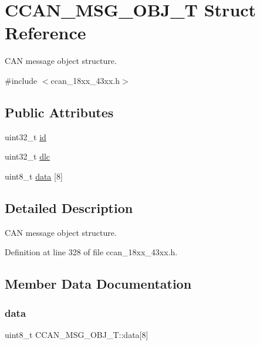 \hypertarget{struct_c_c_a_n___m_s_g___o_b_j___t}{}\section{C\+C\+A\+N\+\_\+\+M\+S\+G\+\_\+\+O\+B\+J\+\_\+T Struct Reference}
\label{struct_c_c_a_n___m_s_g___o_b_j___t}


C\+AN message object structure.  




{\ttfamily \#include $<$ccan\+\_\+18xx\+\_\+43xx.\+h$>$}

\subsection*{Public Attributes}
\begin{DoxyCompactItemize}
\item 
uint32\+\_\+t \hyperlink{struct_c_c_a_n___m_s_g___o_b_j___t_a84856f0c1c7f3dc0cc77cabc5c944ec2}{id}
\item 
uint32\+\_\+t \hyperlink{struct_c_c_a_n___m_s_g___o_b_j___t_aab1a8e17e19a96cc7491561a2f2b9b76}{dlc}
\item 
uint8\+\_\+t \hyperlink{struct_c_c_a_n___m_s_g___o_b_j___t_a240ade50b29e35fd72231b1a7d0686f0}{data} \mbox{[}8\mbox{]}
\end{DoxyCompactItemize}


\subsection{Detailed Description}
C\+AN message object structure. 

Definition at line 328 of file ccan\+\_\+18xx\+\_\+43xx.\+h.



\subsection{Member Data Documentation}
\mbox{\label{struct_c_c_a_n___m_s_g___o_b_j___t_a240ade50b29e35fd72231b1a7d0686f0}} 
\subsubsection{\texorpdfstring{data}{data}}
{\footnotesize\ttfamily uint8\+\_\+t C\+C\+A\+N\+\_\+\+M\+S\+G\+\_\+\+O\+B\+J\+\_\+\+T\+::data\mbox{[}8\mbox{]}}


